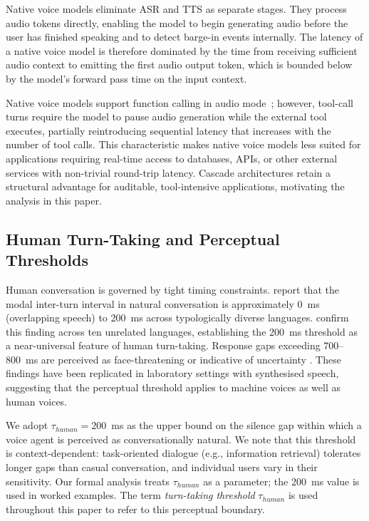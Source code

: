 Native voice models eliminate ASR and TTS as separate stages.
They process audio tokens directly, enabling the model to begin generating audio
before the user has finished speaking and to detect barge-in events internally.
The latency of a native voice model is therefore dominated by the time from receiving
sufficient audio context to emitting the first audio output token,
which is bounded below by the model's forward pass time on the input context.

Native voice models support function calling in audio mode~\citep{openai2024realtimeapi};
however, tool-call turns require the model to pause audio generation while the external tool executes,
partially reintroducing sequential latency that increases with the number of tool calls.
This characteristic makes native voice models less suited for applications requiring
real-time access to databases, APIs, or other external services with non-trivial round-trip latency.
Cascade architectures retain a structural advantage for auditable, tool-intensive applications,
motivating the analysis in this paper.

\subsection{Human Turn-Taking and Perceptual Thresholds}

Human conversation is governed by tight timing constraints.
\citet{levinson2015timing} report that the modal inter-turn interval in natural conversation
is approximately 0~ms (overlapping speech) to 200~ms across typologically diverse languages.
\citet{stivers2009universals} confirm this finding across ten unrelated languages,
establishing the 200~ms threshold as a near-universal feature of human turn-taking.
Response gaps exceeding 700--800~ms are perceived as face-threatening or indicative of
uncertainty \citep{levinson2015timing}.
These findings have been replicated in laboratory settings with synthesised speech,
suggesting that the perceptual threshold applies to machine voices as well as human voices.

We adopt $\tau_{human} = 200$~ms as the upper bound on the silence gap within which a voice
agent is perceived as conversationally natural.
We note that this threshold is context-dependent:
task-oriented dialogue (e.g., information retrieval) tolerates longer gaps than casual conversation,
and individual users vary in their sensitivity.
Our formal analysis treats $\tau_{human}$ as a parameter; the 200~ms value is used in worked
examples.
The term \emph{turn-taking threshold} $\tau_{human}$ is used throughout this paper to refer
to this perceptual boundary.


